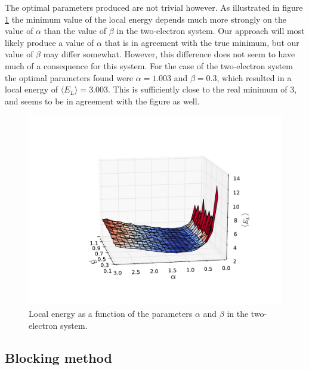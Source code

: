 \documentclass[english, a4paper]{article}
\newcommand\bk[1]{\langle#1\rangle}
\begin{document}
	The optimal parameters produced are not trivial however. As illustrated in figure \ref{fig:energyPlot15x15N2} the minimum value of the local energy depends much more strongly on the value of $\alpha$ than the value of $\beta$ in the two-electron system. Our approach will most likely produce a value of $\alpha$ that is in agreement with the true minimum, but our value of $\beta$ may differ somewhat. However, this difference does not seem to have much of a consequence for this system. For the case of the two-electron system the optimal parameters found were $\alpha=1.003$ and $\beta=0.3$, which resulted in a local energy of $\bk{E_L} = 3.003$. This is sufficiently close to the real minimum of 3, and seems to be in agreement with the figure as well.
	
	
	
\begin{figure}[H]
\centering
\includegraphics[width=0.8\linewidth, trim={0 2cm 0 4.5cm}, clip]{figures/energySurface/energyPlot15x15N2}
\caption{Local energy as a function of the parameters $\alpha$ and $\beta$ in the two-electron system.}
\label{fig:energyPlot15x15N2}
\end{figure}
	
	\subsection{Blocking method} \label{blockingTheory}
	
\end{document}
